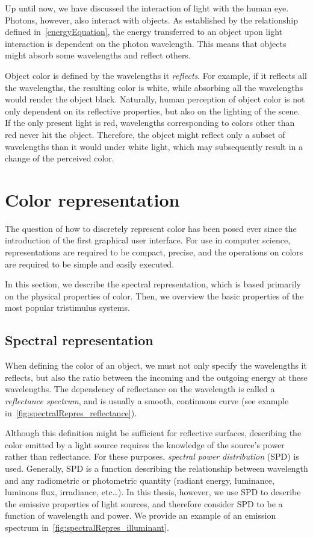 Up until now, we have discussed the interaction of light with the human eye. Photons, however, also interact with objects. As established by the relationship defined in~\cref{energyEquation}, the energy transferred to an object upon light interaction is dependent on the photon wavelength. This means that objects might absorb some wavelengths and reflect others.

Object color is defined by the wavelengths it \emph{reflects}. For example, if it reflects all the wavelengths, the resulting color is white, while absorbing all the wavelengths would render the object black. Naturally, human perception of object color is not only dependent on its reflective properties, but also on the lighting of the scene. If the only present light is red, wavelengths corresponding to colors other than red never hit the object. Therefore, the object might reflect only a subset of wavelengths than it would under white light, which may subsequently result in a change of the perceived color.

\section{Color representation} \label{sec:colorRepresentation}

The question of how to discretely represent color has been posed ever since the introduction of the first graphical user interface. For use in computer science, representations are required to be compact, precise, and the operations on colors are required to be simple and easily executed.

In this section, we describe the spectral representation, which is based primarily on the physical properties of color. Then, we overview the basic properties of the most popular tristimulus systems.

\subsection{Spectral representation}

When defining the color of an object, we must not only specify the wavelengths it reflects, but also the ratio between the incoming and the outgoing energy at these wavelengths. The dependency of reflectance on the wavelength is called a \emph{reflectance spectrum}, and is usually a smooth, continuous curve (see example in~\cref{fig:spectralRepres_reflectance}).

Although this definition might be sufficient for reflective surfaces, describing the color emitted by a light source requires the knowledge of the source's power rather than reflectance. For these purposes, \emph{spectral power distribution} (SPD) is used. Generally, SPD is a function describing the relationship between wavelength and any radiometric or photometric quantity (radiant energy, luminance, luminous flux, irradiance, etc\ldots). In this thesis, however, we use SPD to describe the emissive properties of light sources, and therefore consider SPD to be a function of wavelength and power. We provide an example of an emission spectrum in~\cref{fig:spectralRepres_illuminant}.

